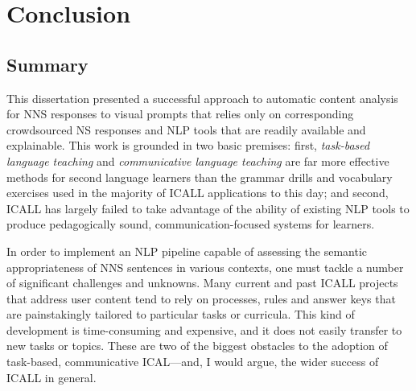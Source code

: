 \chapter{Conclusion}
\label{chap:conclusion}

\section{Summary}
\label{sec:conclusion-summary}


This dissertation presented a successful approach to automatic content analysis for NNS responses to visual prompts that relies only on corresponding crowdsourced NS responses and NLP tools that are readily available and explainable. This work is grounded in two basic premises: first, \textit{task-based language teaching} and \textit{communicative language teaching} are far more effective methods for second language learners than the grammar drills and vocabulary exercises used in the majority of ICALL applications to this day; and second, ICALL has largely failed to take advantage of the ability of existing NLP tools to produce pedagogically sound, communication-focused systems for learners. 

In order to implement an NLP pipeline capable of assessing the semantic appropriateness of NNS sentences in various contexts, one must tackle a number of significant challenges and unknowns. Many current and past ICALL projects that address user content tend to rely on processes, rules and answer keys that are painstakingly tailored to particular tasks or curricula. This kind of development is time-consuming and expensive, and it does not easily transfer to new tasks or topics. These are two of the biggest obstacles to the adoption of task-based, communicative ICAL---and, I would argue, the wider success of ICALL in general. 

